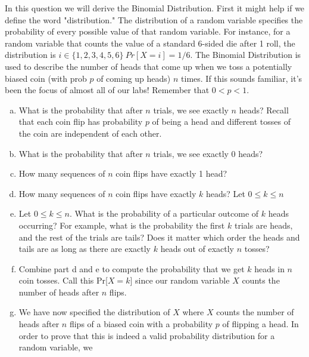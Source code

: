 \documentclass[]{article}
\begin{document}
\begin{qunlist}
\begin{enumerate}[a)]
\end{enumerate}
  
In this question we will derive the Binomial Distribution. First it might help if we define the word "distribution." The distribution of a random variable specifies the probability of every possible value of that random variable. For instance, for a random variable that counts the value of a standard 6-sided die after 1 roll, the distribution is $i \in \{1,2,3,4,5,6\} \ Pr[X = i] = 1/6$. %
The Binomial Distribution is used to describe the number of heads that
come up when we toss a potentially biased coin (with prob $p$ of
coming up heads) $n$ times. If this sounds familiar, it's been the focus of almost all of our labs! Remember that $0 < p < 1$.
\begin{enumerate}[a)]
\qpart
\item What is the probability that after $n$ trials, we see exactly
  $n$ heads? Recall that each coin flip has probability $p$ of being a
  head and different tosses of the coin are independent of each other.
\qpart
\item What is the probability that after $n$ trials, we see exactly $0$ heads?
\qpart
\item How many sequences of $n$ coin flips have exactly 1 head?
\qpart
\item How many sequences of $n$ coin flips have exactly $k$ heads? Let  $0 \leq k \leq n$ 
\qpart
\item  Let  $0 \leq k \leq n$. What is the probability of a particular
  outcome of $k$ heads occurring? For example, what is the probability
  the first $k$ trials are heads, and the rest of the trials are
  tails? Does it matter which order the heads and tails are as long as
  there are exactly $k$ heads out of exactly $n$ tosses?
\qpart
\item Combine part d and e to compute the probability that we get $k$
  heads in $n$ coin tosses. Call this Pr[$X = k$] since our random variable $X$ counts the number of heads after $n$ flips. 
\qpart
\item We have now specified the distribution of $X$ where $X$ counts
  the number of heads after $n$ flips of a biased coin with a
  probability $p$ of flipping a head. In order to prove that this is
  indeed a valid probability distribution for a random variable, we

\end{enumerate}
\end{qunlist}
\end{document}
